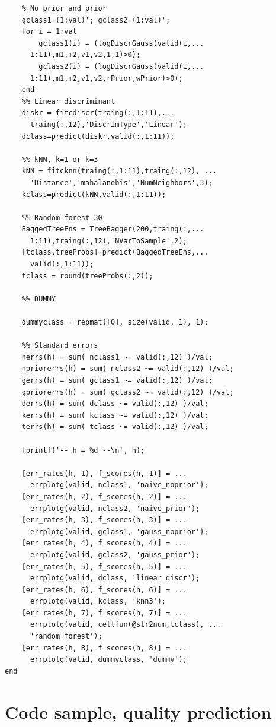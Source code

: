 \documentclass[twoside]{article}
\begin{document}
\begin{multicols}{2}
{\begin{verbatim}
    % No prior and prior
    gclass1=(1:val)'; gclass2=(1:val)'; 
    for i = 1:val
        gclass1(i) = (logDiscrGauss(valid(i,...
	  1:11),m1,m2,v1,v2,1,1)>0);
        gclass2(i) = (logDiscrGauss(valid(i,...
	  1:11),m1,m2,v1,v2,rPrior,wPrior)>0);
    end 
    %% Linear discriminant
    diskr = fitcdiscr(traing(:,1:11),...
      traing(:,12),'DiscrimType','Linear');
    dclass=predict(diskr,valid(:,1:11));

    %% kNN, k=1 or k=3
    kNN = fitcknn(traing(:,1:11),traing(:,12), ...
      'Distance','mahalanobis','NumNeighbors',3);
    kclass=predict(kNN,valid(:,1:11));

    %% Random forest 30
    BaggedTreeEns = TreeBagger(200,traing(:,...
      1:11),traing(:,12),'NVarToSample',2);
    [tclass,treeProbs]=predict(BaggedTreeEns,...
      valid(:,1:11));
    tclass = round(treeProbs(:,2));
    
    %% DUMMY

    dummyclass = repmat([0], size(valid, 1), 1);

    %% Standard errors
    nerrs(h) = sum( nclass1 ~= valid(:,12) )/val;
    npriorerrs(h) = sum( nclass2 ~= valid(:,12) )/val;
    gerrs(h) = sum( gclass1 ~= valid(:,12) )/val;
    gpriorerrs(h) = sum( gclass2 ~= valid(:,12) )/val;
    derrs(h) = sum( dclass ~= valid(:,12) )/val;
    kerrs(h) = sum( kclass ~= valid(:,12) )/val;
    terrs(h) = sum( tclass ~= valid(:,12) )/val;

    fprintf('-- h = %d --\n', h);

    [err_rates(h, 1), f_scores(h, 1)] = ... 
      errplotg(valid, nclass1, 'naive_noprior');
    [err_rates(h, 2), f_scores(h, 2)] = ...
      errplotg(valid, nclass2, 'naive_prior');
    [err_rates(h, 3), f_scores(h, 3)] = ...
      errplotg(valid, gclass1, 'gauss_noprior');
    [err_rates(h, 4), f_scores(h, 4)] = ...
      errplotg(valid, gclass2, 'gauss_prior');
    [err_rates(h, 5), f_scores(h, 5)] = ...
      errplotg(valid, dclass, 'linear_discr');
    [err_rates(h, 6), f_scores(h, 6)] = ...
      errplotg(valid, kclass, 'knn3');
    [err_rates(h, 7), f_scores(h, 7)] = ...
      errplotg(valid, cellfun(@str2num,tclass), ...
      'random_forest');
    [err_rates(h, 8), f_scores(h, 8)] = ...
      errplotg(valid, dummyclass, 'dummy');
end

\end{verbatim}

}

\section{Code sample, quality prediction}\label{appendix:qualitycode}


\end{multicols}
\end{document}
